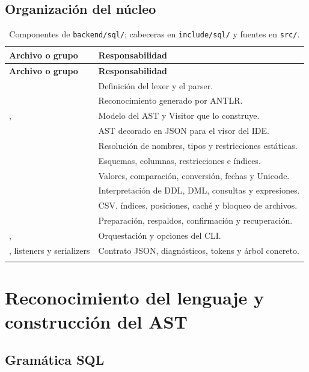 \documentclass[11pt,a4paper]{article}
\begin{document}
\subsection{Organización del núcleo}
\begin{longtable}{@{}L{5.4cm}L{8.9cm}@{}}
\toprule\textbf{Archivo o grupo} & \textbf{Responsabilidad}\\\midrule
\endfirsthead
\toprule\textbf{Archivo o grupo} & \textbf{Responsabilidad}\\\midrule\endhead
{} & Definición del lexer y el parser.\\
 & Reconocimiento generado por ANTLR.\\
,  & Modelo del AST y Visitor que lo construye.\\
 & AST decorado en JSON para el visor del IDE.\\
 & Resolución de nombres, tipos y restricciones estáticas.\\
 & Esquemas, columnas, restricciones e índices.\\
 & Valores, comparación, conversión, fechas y Unicode.\\
 & Interpretación de DDL, DML, consultas y expresiones.\\
 & CSV, índices, posiciones, caché y bloqueo de archivos.\\
 & Preparación, respaldos, confirmación y recuperación.\\
,  & Orquestación y opciones del CLI.\\
, listeners y serializers & Contrato JSON, diagnósticos, tokens y árbol concreto.\\
\bottomrule
\caption{Componentes de \texttt{backend/sql/}; cabeceras en \texttt{include/sql/} y fuentes en \texttt{src/}.}
\end{longtable}

\section{Reconocimiento del lenguaje y construcción del AST}
\subsection{Gramática SQL}
\end{document}
